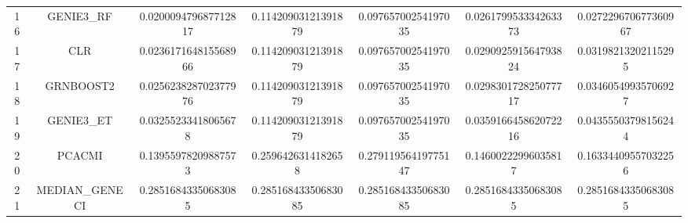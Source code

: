 \documentclass[a4paper,10pt]{article}
\begin{document}
\begin{landscape}
\begin{table}[!htp]
\begin{tabular}{ccccccc}
16&GENIE3_RF&0.020009479687712817&0.11420903121391879&0.09765700254197035&0.026179953334263373&0.027229670677360967\\
17&CLR&0.023617164815568966&0.11420903121391879&0.09765700254197035&0.029092591564793824&0.03198213202115295\\
18&GRNBOOST2&0.025623828702377976&0.11420903121391879&0.09765700254197035&0.029830172825077717&0.03460549935706927\\
19&GENIE3_ET&0.03255233418065678&0.11420903121391879&0.09765700254197035&0.035916645862072216&0.04355503798156244\\
20&PCACMI&0.13955978209887573&0.2596426314182658&0.27911956419775147&0.14600222996035817&0.16334409557032256\\
21&MEDIAN_GENECI&0.28516843350683085&0.28516843350683085&0.28516843350683085&0.28516843350683085&0.28516843350683085\\
\hline
\end{tabular}
\end{table}


\newpage


\end{landscape}
\end{document}
